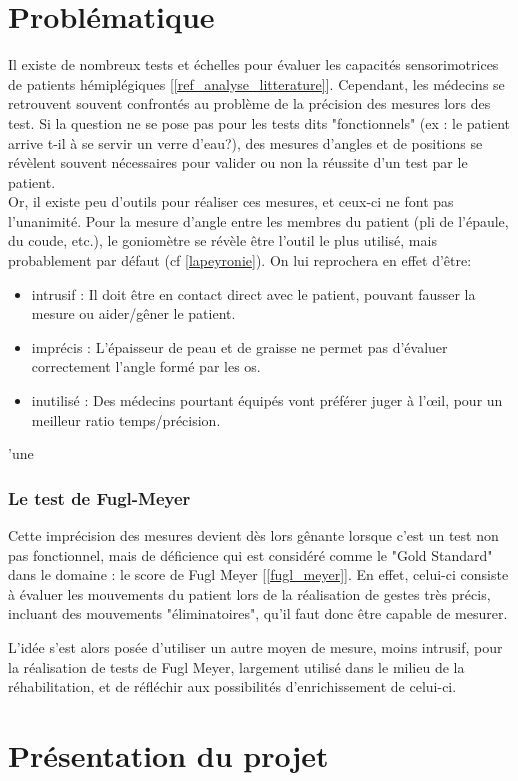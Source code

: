 \documentclass[french,12pt]{report}
\begin{document}
		\section{Problématique}
Il existe de nombreux tests et échelles pour évaluer les capacités sensorimotrices de patients hémiplégiques [\ref {ref_analyse_litterature}]. Cependant, les médecins se retrouvent souvent confrontés au problème de la précision des mesures lors des test. Si la question ne se pose pas pour les tests dits "fonctionnels" (ex : le patient arrive t-il à se servir un verre d'eau?), des mesures d'angles et de positions se révèlent souvent nécessaires pour valider ou non la réussite d'un test par le patient.
\\Or, il existe peu d'outils pour réaliser ces mesures, et ceux-ci ne font pas l'unanimité. Pour la mesure d'angle entre les membres du patient (pli de l'épaule, du coude, etc.), le goniomètre se révèle être l'outil le plus utilisé, mais probablement par défaut (cf \ref{lapeyronie}). On lui reprochera en effet d'être: 
\begin{itemize}
	\item {intrusif :} Il doit être en contact direct avec le patient, pouvant fausser la mesure ou aider/gêner le patient.
	\item {imprécis :} L'épaisseur de peau et de graisse ne permet pas d'évaluer correctement l'angle formé par les os.
	\item {inutilisé :} Des médecins pourtant équipés vont préférer juger à l'œil, pour un meilleur ratio temps/précision.
\end{itemize}
		'une
		\subsubsection{Le test de Fugl-Meyer}
Cette imprécision des mesures devient dès lors gênante lorsque c'est un test non pas fonctionnel, mais de déficience qui est considéré comme le "Gold Standard" dans le domaine : le score de Fugl Meyer [\ref{fugl_meyer}]. En effet, celui-ci consiste à évaluer les mouvements du patient lors de la réalisation de gestes très précis, incluant des mouvements "éliminatoires", qu'il faut donc être capable de mesurer.	
	
	L'idée s'est alors posée d'utiliser un autre moyen de mesure, moins intrusif, pour la réalisation de tests de Fugl Meyer, largement utilisé dans le milieu de la réhabilitation, et de réfléchir aux possibilités d'enrichissement de celui-ci.
\newpage
		\section{Présentation du projet}
		
\end{document}
